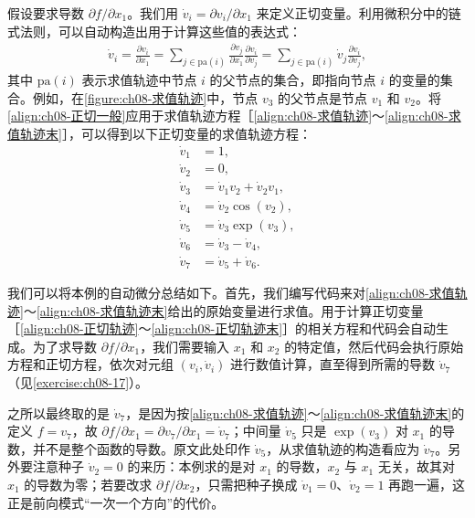 \documentclass[../../main.tex]{subfiles}
\begin{document}
假设要求导数 $\partial f/\partial x_1$。我们用 $\dot{v}_i=\partial v_i/\partial x_1$ 来定义正切变量。利用微积分中的链式法则，可以自动构造出用于计算这些值的表达式：
\begin{align}
\dot{v}_i=\frac{\partial v_i}{\partial x_1}=\sum_{j\in\mathrm{pa}(i)}\frac{\partial v_j}{\partial x_1}\frac{\partial v_i}{\partial v_j}
=\sum_{j\in\mathrm{pa}(i)}\dot{v}_j\frac{\partial v_i}{\partial v_j},
\label{align:ch08-正切一般}
\end{align}
其中 $\mathrm{pa}(i)$ 表示求值轨迹中节点 $i$ 的父节点的集合，即指向节点 $i$ 的变量的集合。例如，在\cref{figure:ch08-求值轨迹}中，节点 $v_3$ 的父节点是节点 $v_1$ 和 $v_2$。将\eqref{align:ch08-正切一般}应用于求值轨迹方程［\eqref{align:ch08-求值轨迹}～\eqref{align:ch08-求值轨迹末}］，可以得到以下正切变量的求值轨迹方程：
\begin{align}
\dot{v}_1&=1,\label{align:ch08-正切轨迹}\\
\dot{v}_2&=0,\nonumber\\
\dot{v}_3&=\dot{v}_1v_2+\dot{v}_2v_1,\nonumber\\
\dot{v}_4&=\dot{v}_2\cos\left(v_2\right),\nonumber\\
\dot{v}_5&=\dot{v}_3\exp\left(v_3\right),\nonumber\\
\dot{v}_6&=\dot{v}_3-\dot{v}_4,\nonumber\\
\dot{v}_7&=\dot{v}_5+\dot{v}_6.
\label{align:ch08-正切轨迹末}
\end{align}

我们可以将本例的自动微分总结如下。首先，我们编写代码来对\eqref{align:ch08-求值轨迹}～\eqref{align:ch08-求值轨迹末}给出的原始变量进行求值。用于计算正切变量［\eqref{align:ch08-正切轨迹}～\eqref{align:ch08-正切轨迹末}］的相关方程和代码会自动生成。为了求导数 $\partial f/\partial x_1$，我们需要输入 $x_1$ 和 $x_2$ 的特定值，然后代码会执行原始方程和正切方程，依次对元组 $(v_i,\dot{v}_i)$ 进行数值计算，直至得到所需的导数 $\dot{v}_7$（见\cref{exercise:ch08-17}）。

\begin{remark}
之所以最终取的是 $\dot{v}_7$，是因为按\eqref{align:ch08-求值轨迹}～\eqref{align:ch08-求值轨迹末}的定义 $f=v_7$，故 $\partial f/\partial x_1=\partial v_7/\partial x_1=\dot{v}_7$；中间量 $\dot{v}_5$ 只是 $\exp(v_3)$ 对 $x_1$ 的导数，并不是整个函数的导数。原文此处印作 $\dot{v}_5$，从求值轨迹的构造看应为 $\dot{v}_7$。另外要注意种子 $\dot{v}_2=0$ 的来历：本例求的是对 $x_1$ 的导数，$x_2$ 与 $x_1$ 无关，故其对 $x_1$ 的导数为零；若要改求 $\partial f/\partial x_2$，只需把种子换成 $\dot{v}_1=0$、$\dot{v}_2=1$ 再跑一遍，这正是前向模式“一次一个方向”的代价。
\end{remark}
\end{document}
